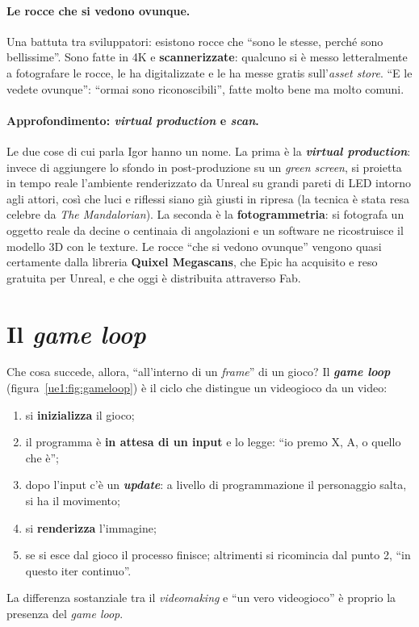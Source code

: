 \paragraph{Le rocce che si vedono ovunque.} Una battuta tra sviluppatori: esistono rocce
che ``sono le stesse, perché sono bellissime''. Sono fatte in 4K e
\textbf{scannerizzate}: qualcuno si è messo letteralmente a fotografare le rocce, le ha
digitalizzate e le ha messe gratis sull'\emph{asset store}. ``E le vedete ovunque'':
``ormai sono riconoscibili'', fatte molto bene ma molto comuni.

\paragraph{Approfondimento: \emph{virtual production} e \emph{scan}.} Le due cose di cui
parla Igor hanno un nome. La prima è la \textbf{\emph{virtual production}}: invece di
aggiungere lo sfondo in post-produzione su un \emph{green screen}, si proietta in
tempo reale l'ambiente renderizzato da Unreal su grandi pareti di LED intorno agli
attori, così che luci e riflessi siano già giusti in ripresa (la tecnica è stata resa
celebre da \emph{The Mandalorian}). La seconda è la \textbf{fotogrammetria}: si
fotografa un oggetto reale da decine o centinaia di angolazioni e un software ne
ricostruisce il modello 3D con le texture. Le rocce ``che si vedono ovunque'' vengono
quasi certamente dalla libreria \textbf{Quixel Megascans}, che Epic ha acquisito e reso
gratuita per Unreal, e che oggi è distribuita attraverso Fab.

\section{Il \emph{game loop}}
\label{ue1:sec:gameloop}

Che cosa succede, allora, ``all'interno di un \emph{frame}'' di un gioco? Il
\textbf{\emph{game loop}} (figura~\ref{ue1:fig:gameloop}) è il ciclo che distingue un
videogioco da un video:
\begin{enumerate}
  \item si \textbf{inizializza} il gioco;
  \item il programma è \textbf{in attesa di un input} e lo legge: ``io premo X, A, o
        quello che è'';
  \item dopo l'input c'è un \textbf{\emph{update}}: a livello di programmazione il
        personaggio salta, si ha il movimento;
  \item si \textbf{renderizza} l'immagine;
  \item se si esce dal gioco il processo finisce; altrimenti si ricomincia dal punto 2,
        ``in questo iter continuo''.
\end{enumerate}
La differenza sostanziale tra il \emph{videomaking} e ``un vero videogioco'' è proprio
la presenza del \emph{game loop}.


